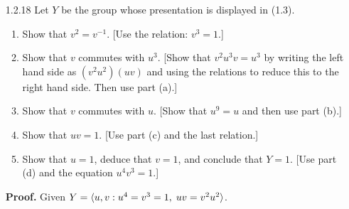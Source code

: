 \begin{enumerate}
      \begin{enumerate}
         \item Let $n = 3k$. Notice that we can deduce the relation
               $x^n = x^{3k} = 1$ from the relation $x^3 = 1$. Thus
               $$X_{2n} = \cyc{x, y :  x^3 = y^2 = 1, \;xy = yx^2}.$$
               Since no other collapsing is possible it follows that
               $|X_{2n}| = |x| \cdot |y| = 3 \cdot 2 = 6$. Since $x^3 = 1$, it
               follows that $x^2 = x^{-1}$. Thus the relation $xy = yx^2$ is
               equivalent to $xy = yx^{-1}$. If we replace $x$ by $r$ and $y$ by
               $s$, then we see that $X_{2n}$ has the same generators and
               relations as $D_6$.
         \item Suppose $(3, n) = 1$. Thus there exist integers $p$ and $q$ such
               that $1 = 3p + nq$. So
               $x^1 = x^{3p+nq} = (x^3)^p(x^n)^q = 1^p1^q = 1$. Thus
               $X_{2n} = \cyc{y : y^2 = 1}$, so that $|X_{2n}| = 2$.
      \end{enumerate} \qed
   \item[1.2.18]  Let $Y$ be the group whose presentation is displayed in (1.3).
                  \begin{enumerate}
                     \item Show that $v^2 = v^{-1}$.
                           [Use the relation: $v^3 = 1$.]
                     \item Show that $v$ commutes with $u^3$. [Show that
                           $v^2u^3v = u^3$ by writing the left hand side as
                           $(v^2u^2)(uv)$ and using the relations to reduce this
                           to the right hand side. Then use part (a).]
                     \item Show that $v$ commutes with $u$. [Show that $u^9 = u$
                           and then use part (b).]
                     \item Show that $uv = 1$. [Use part (c) and the last
                           relation.]
                     \item Show that $u = 1$, deduce that $v = 1$, and conclude
                           that $Y = 1$. [Use part (d) and the equation
                           $u^4v^3 = 1$.]
                  \end{enumerate}

      \textbf{Proof.} Given $Y = \langle u, v :  u^4 = v^3 = 1, \; uv = v^2u^2 \rangle$.


\end{enumerate}
